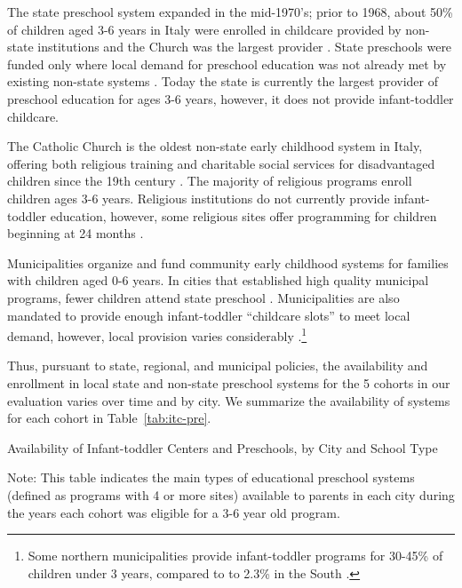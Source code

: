 The state preschool system expanded in the mid-1970's; prior to 1968, about 50\% of children aged 3-6 years in Italy were enrolled in childcare provided by non-state institutions and the Church was the largest provider \citep{Hohnerlein_2009_Paradox-Public-Preschools}. State preschools were funded only where local demand for preschool education was not already met by existing non-state systems \citep{Hohnerlein_2009_Paradox-Public-Preschools}. Today the state is currently the largest provider of preschool education for ages 3-6 years, however, it does not provide infant-toddler childcare. 

The Catholic Church is the oldest non-state early childhood system in Italy, offering both religious training and charitable social services for disadvantaged children since the 19th century \citep{OECD_2001_Italy-Country-Note}. The majority of religious programs enroll children ages 3-6 years. Religious institutions do not currently provide infant-toddler education, however, some religious sites offer programming for children beginning at 24 months \citep{Malizia-Cicatelli_2011_BOOK_Catholic-School}. 

Municipalities organize and fund community early childhood systems for families with children aged 0-6 years. In cities that established high quality municipal programs, fewer children attend state preschool \citep{OECD_2001_Italy-Country-Note}. Municipalities are also mandated to provide enough infant-toddler ``childcare slots'' to meet local demand, however, local provision varies considerably \citep{Saraceno_1984_Soc-Probs}.\footnote{Some northern municipalities provide infant-toddler programs for 30-45\% of children under 3 years, compared to to 2.3\% in the South \citep{Becchi-Ferrari_1990_Pub-Inf-Centres-Italy,Musatti-Picchio_2010_IJEC}.}

Thus, pursuant to state, regional, and municipal policies, the availability and enrollment in local state and non-state preschool systems for the 5 cohorts in our evaluation varies over time and by city. We summarize the availability of systems for each cohort in Table~\ref{tab:itc-pre}. 

\begin{table}[H]
\centering
\caption{Availability of Infant-toddler Centers and Preschools, by City and School Type}\label{tab:itc-pre}
\begin{adjustbox}{width=\textwidth}
\begin{threeparttable}
	
\begin{tablenotes}
Note: This table indicates the main types of educational preschool systems (defined as programs with 4 or more sites) available to parents in each city during the years each cohort was eligible for a 3-6 year old program. 
\end{tablenotes}
\end{threeparttable}
\end{adjustbox}
\end{table}

